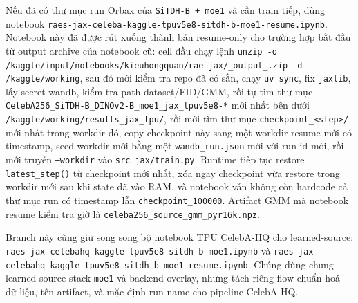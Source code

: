 Nếu đã có thư mục run Orbax của \texttt{SiTDH-B + moe1} và cần train tiếp, dùng
notebook \texttt{raes-jax-celeba-kaggle-tpuv5e8-sitdh-b-moe1-resume.ipynb}. Notebook
này đã được rút xuống thành bản resume-only cho trường hợp bắt đầu từ output
archive của notebook cũ: cell đầu chạy lệnh \texttt{unzip -o
/kaggle/input/notebooks/kieuhongquan/rae-jax/\_output\_.zip -d
/kaggle/working}, sau đó mới kiểm tra repo đã có sẵn, chạy \texttt{uv sync},
fix \texttt{jaxlib}, lấy secret wandb, kiểm tra path dataset/FID/GMM, rồi tự tìm thư mục
\texttt{CelebA256\_SiTDH-B\_DINOv2-B\_moe1\_jax\_tpuv5e8-*} mới nhất bên dưới
\texttt{/kaggle/working/results\_jax\_tpu/}, rồi mới tìm thư mục
\texttt{checkpoint\_<step>/} mới nhất trong workdir đó, copy checkpoint này
sang một workdir resume mới có timestamp, seed workdir mới bằng một
\texttt{wandb\_run.json} mới với run id mới, rồi mới truyền
\texttt{--workdir} vào \texttt{src\_jax/train.py}. Runtime tiếp tục restore
\texttt{latest\_step()} từ checkpoint mới nhất, xóa ngay checkpoint vừa
restore trong workdir mới sau khi state đã vào RAM, và notebook vẫn không còn
hardcode cả thư mục run có timestamp lẫn \texttt{checkpoint\_100000}. Artifact
GMM mà notebook resume kiểm tra giờ là
\texttt{celeba256\_source\_gmm\_pyr16k.npz}.

Branch này cũng giữ song song bộ notebook TPU CelebA-HQ cho learned-source:
\texttt{raes-jax-celebahq-kaggle-tpuv5e8-sitdh-b-moe1.ipynb} và
\texttt{raes-jax-celebahq-kaggle-tpuv5e8-sitdh-b-moe1-resume.ipynb}. Chúng dùng
chung learned-source stack \texttt{moe1} và backend overlay, nhưng tách riêng
flow chuẩn hoá dữ liệu, tên artifact, và mặc định run name cho pipeline
CelebA-HQ.
